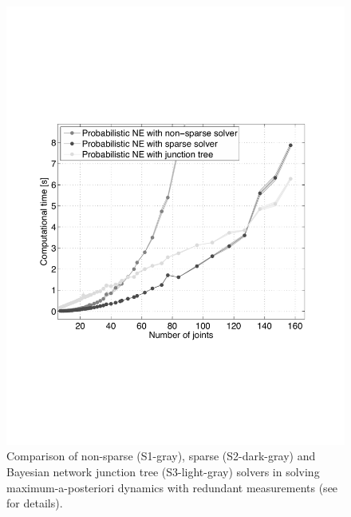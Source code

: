 \begin{figure}
   \centering
   \includegraphics[width=\linewidth]{images/varTimeComplete.pdf}
   \caption{\label{fig:varTimeComplete} Comparison of non-sparse (S1-gray),
   sparse (S2-dark-gray) and Bayesian network junction tree (S3-light-gray)
   solvers in solving maximum-a-posteriori dynamics with redundant
   measurements (see \cite{Nori2015} for details).}
\end{figure}

